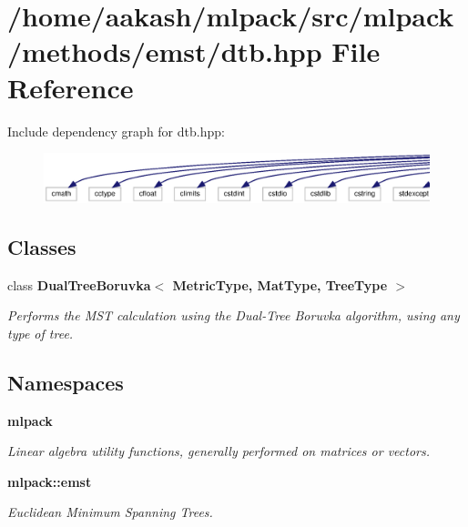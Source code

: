 \section{/home/aakash/mlpack/src/mlpack/methods/emst/dtb.hpp File Reference}
\label{dtb_8hpp}
Include dependency graph for dtb.\+hpp\+:
\nopagebreak
\begin{figure}[H]
\begin{center}
\leavevmode
\includegraphics[width=350pt]{dtb_8hpp__incl}
\end{center}
\end{figure}
\subsection*{Classes}
\begin{DoxyCompactItemize}
\item 
class \textbf{ Dual\+Tree\+Boruvka$<$ Metric\+Type, Mat\+Type, Tree\+Type $>$}
\begin{DoxyCompactList}\small\item\em Performs the M\+ST calculation using the Dual-\/\+Tree Boruvka algorithm, using any type of tree. \end{DoxyCompactList}\end{DoxyCompactItemize}
\subsection*{Namespaces}
\begin{DoxyCompactItemize}
\item 
 \textbf{ mlpack}
\begin{DoxyCompactList}\small\item\em Linear algebra utility functions, generally performed on matrices or vectors. \end{DoxyCompactList}\item 
 \textbf{ mlpack\+::emst}
\begin{DoxyCompactList}\small\item\em Euclidean Minimum Spanning Trees. \end{DoxyCompactList}\end{DoxyCompactItemize}


